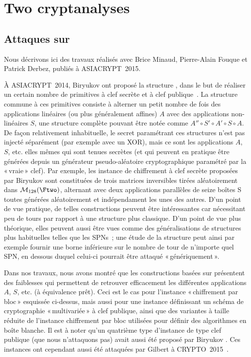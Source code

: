\section[Deux cryptanalyses]{Two cryptanalyses}

\subsection{Attaques sur \asasa \cite{DBLP:conf/asiacrypt/MinaudDFK15}}
Nous décrivons ici des travaux réalisés avec Brice Minaud, Pierre-Alain Fouque et Patrick Derbez, publiés à ASIACRYPT~2015.

\medskip

À ASIACRYPT~2014, Biryukov \etal ont proposé la structure \asasa, dans le but de réaliser un certain nombre de primitives à clef secrète et à clef publique~\cite{DBLP:conf/asiacrypt/BiryukovBK14}.
La structure commune à ces primitives consiste à alterner un petit nombre de fois des applications linéaires (ou plus généralement affines) $A$ avec des applications non-linéaires $S$, une structure
complète pouvant être notée
comme $A'' \circ S' \circ A' \circ S \circ A$. De façon relativement inhabituelle, le secret paramétrant ces structures n'est pas injecté séparément (par exemple avec un XOR), mais ce sont
les applications $A$, $S$, etc. elles mêmes qui sont tenues secrètes (et qui peuvent en pratique être générées depuis un générateur pseudo-aléatoire cryptographique paramétré par la «\,vraie\,»
clef). Par exemple, les instance \asasa de chiffrement à clef secrète proposées par Biryukov \etal sont constituées de
trois matrices inversibles tirées aléatoirement dans $\mathcal{M}_{128}(\Ftwo)$,
alternant avec deux applications parallèles de seize boîtes S toutes générées aléatoirement et indépendament les unes des autres.
D'un point de vue pratique, de telles constructions peuvent être intéressantes car nécessitant peu de tours par rapport à une structure plus classique. D'un point de vue plus théorique, elles peuvent
aussi être vues comme des généralisations de structures plus habituelles telles que les SPNs~; une étude de la structure \asasa peut ainsi par exemple fournir une borne inférieure sur le nombre de tour
de n'importe quel SPN, en dessous duquel celui-ci pourrait être attaqué «\,génériquement\,».

Dans nos travaux, nous avons montré que les constructions basées sur \asasa présentent des faiblesses qui permettent de retrouver efficacement les différentes applications $A$, $S$, etc.
(à équivalence prêt). Ceci est le cas pour l'instance «\,chiffrement par bloc\,» esquissée ci-dessus, mais aussi pour une instance définissant un schéma de cryptographie «\,multivariée\,»
à clef publique, ainsi que des variantes à taille réduite de l'instance chiffrement par bloc utilisées pour définir des algorithmes en boîte blanche.
Il est à noter qu'un quatrième type d'instance de type clef publique (que nous n'attaquons pas) avait aussi été proposé par Biryukov \etal. Ces instances ont cependant aussi été attaquées par
Gilbert \etal à CRYPTO~2015~\cite{DBLP:conf/crypto/GilbertPT15}.
 

